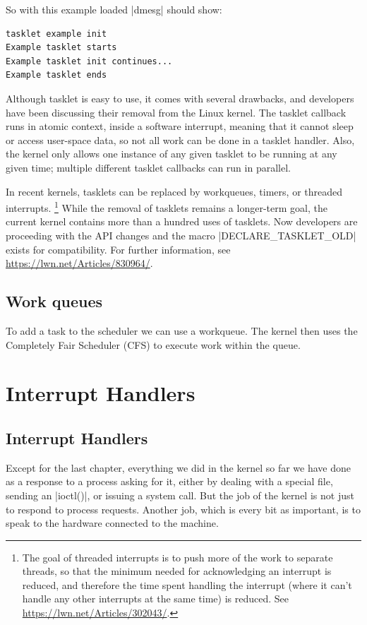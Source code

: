 \documentclass[10pt, oneside]{book}
\begin{document}

So with this example loaded \sh|dmesg| should show:

\begin{verbatim}
tasklet example init
Example tasklet starts
Example tasklet init continues...
Example tasklet ends
\end{verbatim}
Although tasklet is easy to use, it comes with several drawbacks, and developers have been discussing their removal from the Linux kernel.
The tasklet callback runs in atomic context, inside a software interrupt, meaning that it cannot sleep or access user-space data, so not all work can be done in a tasklet handler.
Also, the kernel only allows one instance of any given tasklet to be running at any given time; multiple different tasklet callbacks can run in parallel.

In recent kernels, tasklets can be replaced by workqueues, timers, or threaded interrupts.
\footnote{
The goal of threaded interrupts is to push more of the work to separate threads,
so that the minimum needed for acknowledging an interrupt is reduced,
and therefore the time spent handling the interrupt (where it can't handle any other interrupts at the same time) is reduced.
See \url{https://lwn.net/Articles/302043/}.
}
While the removal of tasklets remains a longer-term goal, the current kernel contains more than a hundred uses of tasklets.
Now developers are proceeding with the API changes and the macro \cpp|DECLARE_TASKLET_OLD| exists for compatibility.
For further information, see \url{https://lwn.net/Articles/830964/}.

\subsection{Work queues}
\label{sec:workqueue}
To add a task to the scheduler we can use a workqueue.
The kernel then uses the Completely Fair Scheduler (CFS) to execute work within the queue.


\section{Interrupt Handlers}
\label{sec:interrupt_handler}
\subsection{Interrupt Handlers}
\label{sec:irq}
Except for the last chapter, everything we did in the kernel so far we have done as a response to a process asking for it, either by dealing with a special file, sending an \cpp|ioctl()|, or issuing a system call.
But the job of the kernel is not just to respond to process requests.
Another job, which is every bit as important, is to speak to the hardware connected to the machine.
\end{document}
